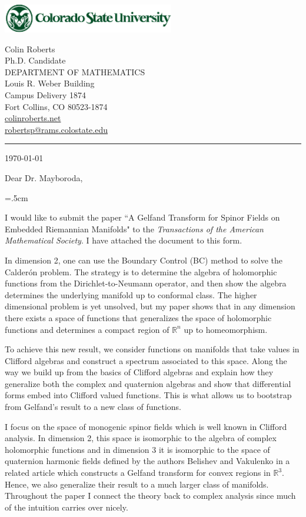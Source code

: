 \documentclass[12pt]{amsart}
\begin{document}
\noindent\includegraphics[width=7.5cm]{csuwrdmrk357.pdf}\\
{\begin{spacing}{0.95}\sf\footnotesize
 Colin Roberts\\
 Ph.D. Candidate\\
{\color{csugreen}DEPARTMENT OF MATHEMATICS}\\
Louis R. Weber Building\\
Campus Delivery 1874\\
Fort Collins, CO 80523-1874\\
\url{colinroberts.net}\\
\url{robertsp@rams.colostate.edu}\\
\end{spacing}
}
\smallskip
{\color{csugreen}\rule{12mm}{0.8mm}}\medskip

\today
\bigskip


\noindent Dear Dr. Mayboroda,
\bigskip

\parindent=.5cm

I would like to submit the paper ``A Gelfand Transform for Spinor Fields on Embedded Riemannian Manifolds" to the \emph{Transactions of the American Mathematical Society}. I have attached the document to this form. 

In dimension 2, one can use the Boundary Control (BC) method to solve the Calder\'on problem. The strategy is to determine the algebra of holomorphic functions from the Dirichlet-to-Neumann operator, and then show the algebra determines the underlying manifold up to conformal class. The higher dimensional problem is yet unsolved, but my paper shows that in any dimension there exists a space of functions that generalizes the space of holomorphic functions and determines a compact region of $\mathbb{R}^n$ up to homeomorphism. 

To achieve this new result, we consider functions on manifolds that take values in Clifford algebras and construct a spectrum associated to this space. Along the way we build up from the basics of Clifford algebras and explain how they generalize both the complex and quaternion algebras and show that differential forms embed into Clifford valued functions. This is what allows us to bootstrap from Gelfand's result to a new class of functions.

I focus on the space of monogenic spinor fields which is well known in Clifford analysis. In dimension 2, this space is isomorphic to the algebra of complex holomorphic functions and in dimension 3 it is isomorphic to the space of quaternion harmonic fields defined by the authors Belishev and Vakulenko in a related article which constructs a Gelfand transform for convex regions in $\mathbb{R}^3$. Hence, we also generalize their result to a much larger class of manifolds. Throughout the paper I connect the theory back to complex analysis since much of the intuition carries over nicely. 
\end{document}
